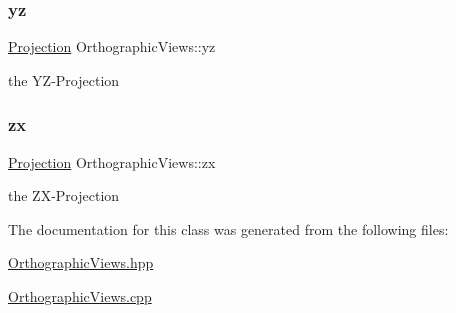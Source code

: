 \subsubsection{\texorpdfstring{yz}{yz}}
{\footnotesize\ttfamily \mbox{\hyperlink{class_projection}{Projection}} Orthographic\+Views\+::yz}



the Y\+Z-\/\+Projection 

\mbox{\label{class_orthographic_views_a4aa367ed88820282a04846786007f153}} 
\subsubsection{\texorpdfstring{zx}{zx}}
{\footnotesize\ttfamily \mbox{\hyperlink{class_projection}{Projection}} Orthographic\+Views\+::zx}



the Z\+X-\/\+Projection 



The documentation for this class was generated from the following files\+:\begin{DoxyCompactItemize}
\item 
\mbox{\hyperlink{_orthographic_views_8hpp}{Orthographic\+Views.\+hpp}}\item 
\mbox{\hyperlink{_orthographic_views_8cpp}{Orthographic\+Views.\+cpp}}\end{DoxyCompactItemize}
